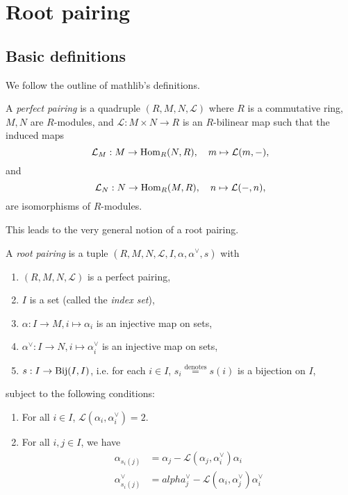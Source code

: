 \chapter{Root pairing}
\label{cha:root-pairing}
\section{Basic definitions}
\label{sec:basic-definitions}

We follow the outline of mathlib's definitions. 

\begin{definition}
    A {\it perfect pairing} is a quadruple $(R,M,N,\mathcal{L})$ where $R$ is a commutative ring, $M,N$ are 
    $R$-modules, and $\mathcal{L} : M \times N \to R$ is an $R$-bilinear map such that the induced maps
    \[
        \mathcal{L}_M : M \to {\rm Hom}_R(N,R), \quad m \mapsto \mathcal{L}(m,-),
    \]
    and 
    \[
        \mathcal{L}_N : N \to {\rm Hom}_R(M,R), \quad n \mapsto \mathcal{L}(-,n),
    \]
    are isomorphisms of $R$-modules.
\end{definition}

This leads to the very general notion of a root pairing.
\begin{definition}
    A {\it root pairing} is a tuple $(R,M,N,\mathcal{L},I,\alpha, \alpha^\vee,s)$ with
       \begin{enumerate} 
        \item $(R,M,N,\mathcal{L})$ is a perfect pairing,
        \item  $I$ is a set (called the {\it index set}),
        \item $\alpha : I \to M, i \mapsto \alpha_i$ is an injective map on sets,
        \item $\alpha^\vee : I \to N, i \mapsto \alpha_i^\vee$ is an injective map on sets,
        \item $s : I \to {\rm Bij}(I,I)$, i.e. for each $i \in I$, $s_i \stackrel{\text{denotes}}{=}s(i)$ is a bijection on $I$,
       \end{enumerate}
       subject to the following conditions:
       \begin{enumerate}[label=\Roman*]
            \item For all $i \in I$, $\mathcal{L}(\alpha_i,\alpha^\vee_i) = 2$.
            \item For all $i,j \in I$, we have
            \begin{align*}
            \alpha_{s_i(j)} &= \alpha_j - \mathcal{L}(\alpha_j,\alpha^\vee_i)\alpha_i \\
            \alpha_{s_i(j)}^\vee &= alpha_j^\vee - \mathcal{L}(\alpha_i,\alpha^\vee_j)\alpha_i^\vee
            \end{align*}
       \end{enumerate}
\end{definition}

